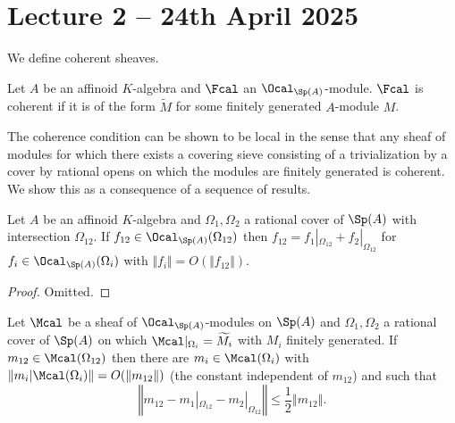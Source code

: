 \section{Lecture 2 -- 24th April 2025}\label{sec: lecture 2}
We define coherent sheaves. 
\begin{definition}\label{def: coherent sheaves}
    Let $A$ be an affinoid $K$-algebra and $\Fcal$ an $\Ocal_{\Sp(A)}$-module. $\Fcal$ is coherent if it is of the form $\widetilde{M}$ for some finitely generated $A$-module $M$. 
\end{definition}
The coherence condition can be shown to be local in the sense that any sheaf of modules for which there exists a covering sieve consisting of a trivialization by a cover by rational opens on which the modules are finitely generated is coherent. We show this as a consequence of a sequence of results. 
\begin{proposition}\label{prop: asymptotic sections of structure sheaf}
  Let $A$ be an affinoid $K$-algebra and $\Omega_{1},\Omega_{2}$ a rational cover of $\Sp(A)$ with intersection $\Omega_{12}$. If $f_{12}\in\Ocal_{\Sp(A)}(\Omega_{12})$ then $f_{12}=f_{1}|_{\Omega_{12}}+f_{2}|_{\Omega_{12}}$ for $f_{i}\in\Ocal_{\Sp(A)}(\Omega_{i})$ with $\Vert f_{i}\Vert=O(\Vert f_{12}\Vert)$. 
\end{proposition}
\begin{proof}
    Omitted. 
\end{proof}
\begin{lemma}\label{lem: weak bound for double intersection elements}
    Let $\Mcal$ be a sheaf of $\Ocal_{\Sp(A)}$-modules on $\Sp(A)$ and $\Omega_{1},\Omega_{2}$ a rational cover of $\Sp(A)$ on which $\Mcal|_{\Omega_{i}}=\widetilde{M_{i}}$ with $M_{i}$ finitely generated. If $m_{12}\in\Mcal(\Omega_{12})$ then there are $m_{i}\in\Mcal(\Omega_{i})$ with $\Vert m_{i}|\Mcal(\Omega_{i})\Vert=O(\Vert m_{12}\Vert)$ (the constant independent of $m_{12}$) and such that 
    $$\left\Vert m_{12}-m_{1}|_{\Omega_{12}}-m_{2}|_{\Omega_{12}}\right\Vert\leq\frac{1}{2}\left\Vert m_{12}\right\Vert.$$
\end{lemma}

